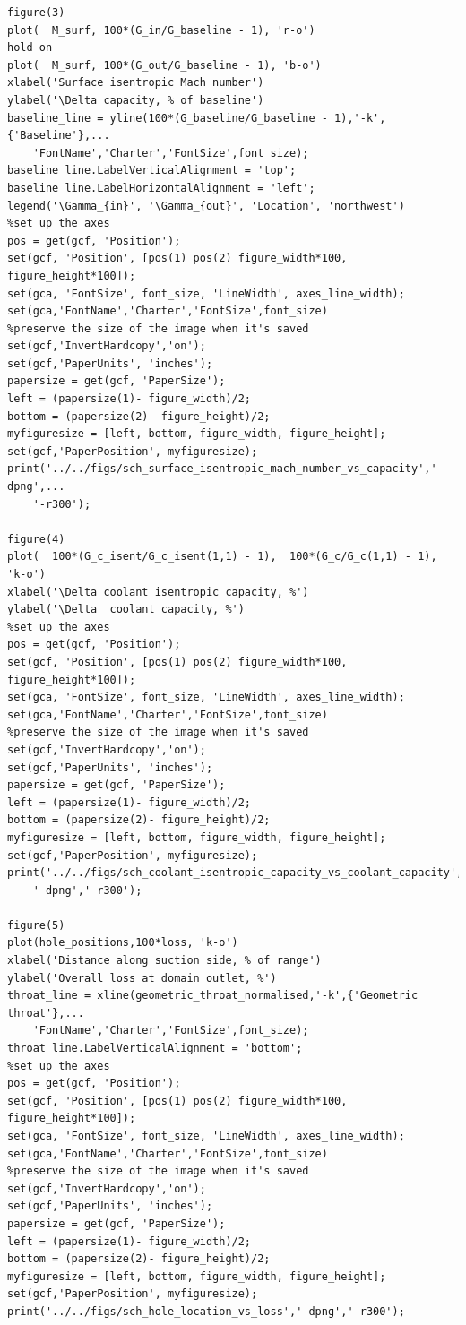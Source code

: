 \documentclass[a4paper, 11pt, oneside]{report}
\begin{document}
\begin{verbatim}
figure(3)
plot(  M_surf, 100*(G_in/G_baseline - 1), 'r-o')
hold on
plot(  M_surf, 100*(G_out/G_baseline - 1), 'b-o')
xlabel('Surface isentropic Mach number')
ylabel('\Delta capacity, % of baseline')
baseline_line = yline(100*(G_baseline/G_baseline - 1),'-k',{'Baseline'},...
    'FontName','Charter','FontSize',font_size);
baseline_line.LabelVerticalAlignment = 'top';
baseline_line.LabelHorizontalAlignment = 'left';
legend('\Gamma_{in}', '\Gamma_{out}', 'Location', 'northwest')
%set up the axes
pos = get(gcf, 'Position');
set(gcf, 'Position', [pos(1) pos(2) figure_width*100, figure_height*100]);
set(gca, 'FontSize', font_size, 'LineWidth', axes_line_width);
set(gca,'FontName','Charter','FontSize',font_size)
%preserve the size of the image when it's saved
set(gcf,'InvertHardcopy','on');
set(gcf,'PaperUnits', 'inches');
papersize = get(gcf, 'PaperSize');
left = (papersize(1)- figure_width)/2;
bottom = (papersize(2)- figure_height)/2;
myfiguresize = [left, bottom, figure_width, figure_height];
set(gcf,'PaperPosition', myfiguresize);
print('../../figs/sch_surface_isentropic_mach_number_vs_capacity','-dpng',...
    '-r300');

figure(4)
plot(  100*(G_c_isent/G_c_isent(1,1) - 1),  100*(G_c/G_c(1,1) - 1), 'k-o')
xlabel('\Delta coolant isentropic capacity, %')
ylabel('\Delta  coolant capacity, %')
%set up the axes
pos = get(gcf, 'Position');
set(gcf, 'Position', [pos(1) pos(2) figure_width*100, figure_height*100]);
set(gca, 'FontSize', font_size, 'LineWidth', axes_line_width);
set(gca,'FontName','Charter','FontSize',font_size)
%preserve the size of the image when it's saved
set(gcf,'InvertHardcopy','on');
set(gcf,'PaperUnits', 'inches');
papersize = get(gcf, 'PaperSize');
left = (papersize(1)- figure_width)/2;
bottom = (papersize(2)- figure_height)/2;
myfiguresize = [left, bottom, figure_width, figure_height];
set(gcf,'PaperPosition', myfiguresize);
print('../../figs/sch_coolant_isentropic_capacity_vs_coolant_capacity',...
    '-dpng','-r300');

figure(5)
plot(hole_positions,100*loss, 'k-o')
xlabel('Distance along suction side, % of range')
ylabel('Overall loss at domain outlet, %')
throat_line = xline(geometric_throat_normalised,'-k',{'Geometric throat'},...
    'FontName','Charter','FontSize',font_size);
throat_line.LabelVerticalAlignment = 'bottom';
%set up the axes
pos = get(gcf, 'Position');
set(gcf, 'Position', [pos(1) pos(2) figure_width*100, figure_height*100]);
set(gca, 'FontSize', font_size, 'LineWidth', axes_line_width);
set(gca,'FontName','Charter','FontSize',font_size)
%preserve the size of the image when it's saved
set(gcf,'InvertHardcopy','on');
set(gcf,'PaperUnits', 'inches');
papersize = get(gcf, 'PaperSize');
left = (papersize(1)- figure_width)/2;
bottom = (papersize(2)- figure_height)/2;
myfiguresize = [left, bottom, figure_width, figure_height];
set(gcf,'PaperPosition', myfiguresize);
print('../../figs/sch_hole_location_vs_loss','-dpng','-r300');
\end{verbatim}
\end{document}
